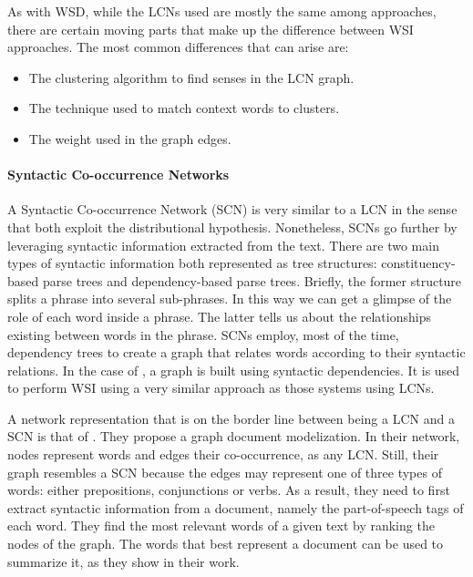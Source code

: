 As with WSD, while the LCNs used are mostly the same among approaches, there are certain moving parts that make up the difference between WSI approaches. The most common differences that can arise are:

\begin{itemize}
\item The clustering algorithm to find senses in the LCN graph.
\item The technique used to match context words to clusters.
\item The weight used in the graph edges.
\end{itemize}



\paragraph{Syntactic Co-occurrence Networks}
A Syntactic Co-occurrence Network (SCN) is very similar to a LCN  in the sense that both exploit the distributional hypothesis. Nonetheless, SCNs go further by leveraging  syntactic information extracted from the text. There are two main types of syntactic information both represented as tree structures: constituency-based parse trees and dependency-based parse trees. Briefly, the former structure splits a phrase into several sub-phrases. In this way we can get a glimpse of the role of each word inside a phrase. The latter tells us about the relationships existing between words in the phrase. SCNs employ, most of the time, dependency trees to create a graph that relates words according to their syntactic relations. In the case of \cite{2013.Hope.GradedWSI}, a graph is built using syntactic dependencies. It is used to perform WSI using a very similar approach as those systems using LCNs. 

A network representation that is on the border line between being a LCN and a SCN is that of \cite{2013.Bronselaer.TextAnalysisWithGraphs}. They  propose a graph document modelization. In their network, nodes represent words and edges their co-occurrence, as any LCN. Still, their graph resembles a SCN because the edges may represent one of three types of words: either prepositions, conjunctions or verbs. As a result,  they need to first extract syntactic information from a document, namely the part-of-speech tags of each word. They find the most relevant words of a given text by ranking the nodes of the graph. The words that best represent a document can be used to summarize it, as they show in their work.


